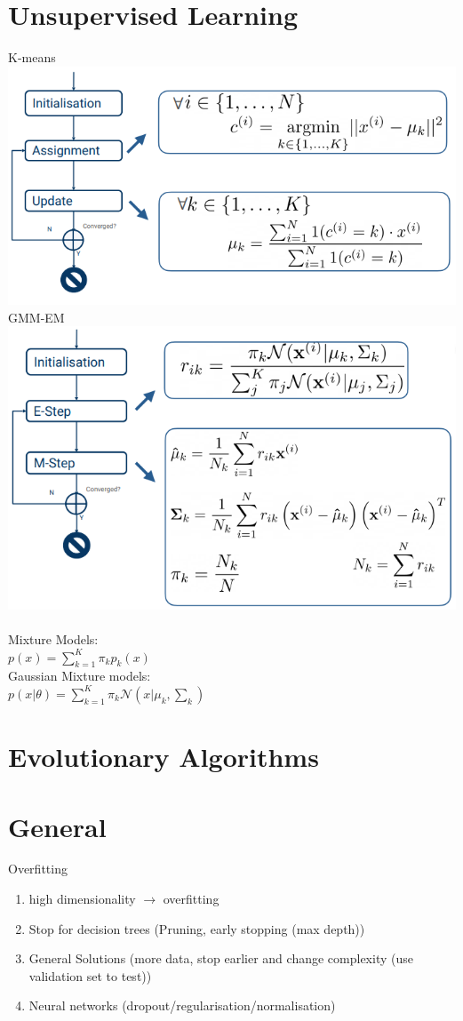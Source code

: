 \documentclass[a4paper, 10pt, twocolumn]{article}
\begin{document}
\section{Unsupervised Learning} 
K-means \\
\includegraphics[scale=0.5]{k-means.png} \\
GMM-EM \\
\includegraphics[scale=0.5]{GMM-EM.png} \\ \\
Mixture Models: \\$p(x) = \sum^K_{k=1} \pi_k p_k(x)$ \\
Gaussian Mixture models: \\$p(x|\theta) = \sum^K_{k=1} \pi_k \mathcal{N}(x|\mu_k, \sum_k)$
\section{Evolutionary Algorithms}

\section{General}
Overfitting
\begin{enumerate}
	\item high dimensionality $\rightarrow$  overfitting
	\item Stop for decision trees (Pruning, early stopping (max depth))
	\item General Solutions (more data, stop earlier and change complexity (use validation set to test))
	\item Neural networks (dropout/regularisation/normalisation)
\end{enumerate}
\end{document}
